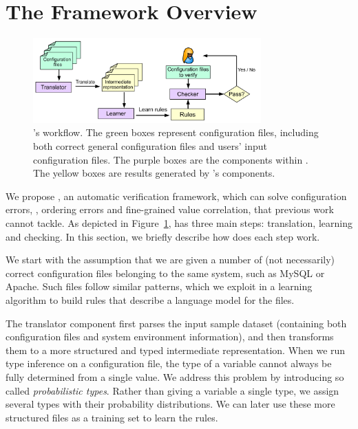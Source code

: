 
\section{The \app Framework Overview}

\begin{figure}[tbp] \centering
\includegraphics[width=0.78\textwidth]{figs/overview}
\caption{\app's workflow. The green boxes represent configuration files,
  including both correct general configuration files and users' input
  configuration files. The purple boxes are the components within \app.
  The yellow boxes are results generated by \app's components.}
\label{fig-overview}
\end{figure}

We propose \app, an automatic verification framework,
which can solve configuration errors, \eg, ordering errors
and fine-grained value correlation, that previous work cannot tackle.
As depicted in Figure~\ref{fig-overview}, \app has three main steps:
translation, learning and checking. In this section, we briefly
describe how does each step work.

We start
with the assumption that we are given a number of (not necessarily) 
correct configuration files belonging to the same system, 
such as MySQL or Apache. 
Such files follow similar patterns, which we exploit
in a learning algorithm to build rules that
describe a language model for the files.

The translator component first parses the input sample 
dataset (containing both configuration files and system environment
information), and then transforms them to a more structured
and typed intermediate representation.
When we run type inference on a configuration file, 
the type of a variable cannot always be fully determined from 
a single value.
We address this problem 
by introducing so called {\em probabilistic types}.
Rather than giving a variable a single type, 
we assign several types with their probability distributions. 
We can later use these more structured files
as a training set to learn the rules. 

